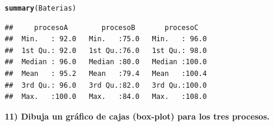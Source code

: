 \documentclass[12pt,letterpaper]{article}\usepackage[]{graphicx}\usepackage[]{color}
\makeatletter
\newcommand{\hlstd}[1]{\textcolor[rgb]{0.345,0.345,0.345}{#1}}%
\newcommand{\hlkwd}[1]{\textcolor[rgb]{0.737,0.353,0.396}{\textbf{#1}}}%
\newenvironment{kframe}{%
 \def\at@end@of@kframe{}%
 \ifinner\ifhmode%
  \def\at@end@of@kframe{\end{minipage}}%
  \begin{minipage}{\columnwidth}%
 \fi\fi%
 \def\FrameCommand##1{\hskip\@totalleftmargin \hskip-\fboxsep
 \colorbox{shadecolor}{##1}\hskip-\fboxsep
     \hskip-\linewidth \hskip-\@totalleftmargin \hskip\columnwidth}%
 \MakeFramed {\advance\hsize-\width
   \@totalleftmargin\z@ \linewidth\hsize
   \@setminipage}}%
 {\par\unskip\endMakeFramed%
 \at@end@of@kframe}
\newenvironment{knitrout}{}{} %
\makeatother
\begin{document}
\begin{knitrout}
\color{fgcolor}\begin{kframe}
\begin{alltt}
\hlkwd{summary}\hlstd{(Baterias)}
\end{alltt}
\begin{verbatim}
##     procesoA        procesoB       procesoC    
##  Min.   : 92.0   Min.   :75.0   Min.   : 96.0  
##  1st Qu.: 92.0   1st Qu.:76.0   1st Qu.: 98.0  
##  Median : 96.0   Median :80.0   Median :100.0  
##  Mean   : 95.2   Mean   :79.4   Mean   :100.4  
##  3rd Qu.: 96.0   3rd Qu.:82.0   3rd Qu.:100.0  
##  Max.   :100.0   Max.   :84.0   Max.   :108.0
\end{verbatim}
\end{kframe}
\end{knitrout}
\textbf{11) Dibuja un gr\'afico de cajas (box-plot) para los tres procesos.}
\end{document}

